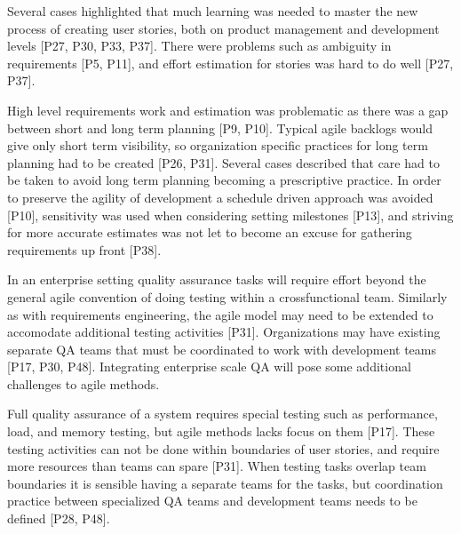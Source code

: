 \documentclass[preprint,authoryear,12pt]{elsarticle}
\begin{document}
Several cases highlighted that much learning was needed to master the new
process of creating user stories, both on product management and development
levels [P27, P30, P33, P37]. There were problems such as ambiguity in
requirements [P5, P11], and effort estimation for stories was hard to do well
[P27, P37].




High level requirements work and estimation was problematic as there was a gap
between short and long term planning [P9, P10]. Typical agile backlogs would
give only short term visibility, so organization specific practices for long
term planning had to be created [P26, P31]. Several cases described that care
had to be taken to avoid long term planning becoming a prescriptive practice. In
order to preserve the agility of development a schedule driven approach was
avoided [P10], sensitivity was used when considering setting milestones [P13],
and striving for more accurate estimates was not let to become an excuse for
gathering requirements up front [P38].


In an enterprise setting quality assurance tasks will require effort beyond the
general agile convention of doing testing within a crossfunctional team.
Similarly as with requirements engineering, the agile model may need to be
extended to accomodate additional testing activities [P31]. Organizations may
have existing separate QA teams that must be coordinated to work with
development teams [P17, P30, P48]. Integrating enterprise scale QA will pose
some additional challenges to agile methods.

Full quality assurance of a system requires special testing such as performance,
load, and memory testing, but agile methods lacks focus on them [P17]. These
testing activities can not be done within boundaries of user stories, and
require more resources than teams can spare [P31]. When testing tasks overlap
team boundaries it is sensible having a separate teams for the tasks, but
coordination practice between specialized QA teams and development teams needs
to be defined [P28, P48].
\end{document}
